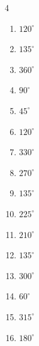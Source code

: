 \begin{multicols}{4}
\begin{enumerate}
  \item $\displaystyle 120^{\circ}$

  \item $\displaystyle 135^{\circ}$

  \item $\displaystyle 360^{\circ}$
        \phantom{$\displaystyle =2\pi$}

  \item $\displaystyle 90^{\circ}$

  \item $\displaystyle 45^{\circ}$

  \item $\displaystyle 120^{\circ}$

  \item $\displaystyle 330^{\circ}$

  \item $\displaystyle 270^{\circ}$

  \item $\displaystyle 135^{\circ}$

  \item $\displaystyle 225^{\circ}$

  \item $\displaystyle 210^{\circ}$

  \item $\displaystyle 135^{\circ}$

  \item $\displaystyle 300^{\circ}$

  \item $\displaystyle 60^{\circ}$

  \item $\displaystyle 315^{\circ}$

  \item $\displaystyle 180^{\circ}$
        \phantom{$\displaystyle =\pi$}


\end{enumerate}
\end{multicols}
